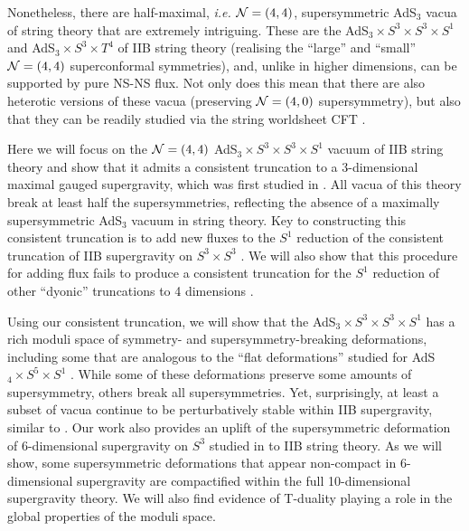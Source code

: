 \documentclass[a4paper, 11pt]{article}
\numberwithin{equation}{section}
\newcommand{\+}{\oplus}
\begin{document}
Nonetheless, there are half-maximal, \textit{i.e.} ${\cal N}=(4,4)$, supersymmetric AdS$_3$ vacua of string theory that are extremely intriguing. These are the AdS$_3 \times S^3 \times S^3 \times S^1$ and AdS$_3 \times S^3 \times T^4$ of IIB string theory (realising the ``large'' and ``small'' ${\cal N}=(4,4)$ superconformal symmetries), and, unlike in higher dimensions, can be supported by pure NS-NS flux. Not only does this mean that there are also heterotic versions of these vacua (preserving ${\cal N}=(4,0)$ supersymmetry), but also that they can be readily studied via the string worldsheet CFT \cite{Maldacena:2000hw,Eberhardt:2018ouy,Eberhardt:2019niq,Eberhardt:2019ywk}.

Here we will focus on the ${\cal N}=(4,4)$ AdS$_3 \times S^3 \times S^3 \times S^1$ vacuum of IIB string theory and show that it admits a consistent truncation to a 3-dimensional maximal gauged supergravity, which was first studied in \cite{Hohm:2005ui}. All vacua of this theory break at least half the supersymmetries, reflecting the absence of a maximally supersymmetric AdS$_3$ vacuum in string theory. Key to constructing this consistent truncation is to add new fluxes to the $S^1$ reduction of the consistent truncation of IIB supergravity on $S^3 \times S^3$ \cite{Inverso:2016eet}. We will also show that this procedure for adding flux fails to produce a consistent truncation for the $S^1$ reduction of other ``dyonic'' truncations to 4 dimensions \cite{Guarino:2015jca,Inverso:2016eet}.

Using our consistent truncation, we will show that the AdS$_3 \times S^3 \times S^3 \times S^1$ has a rich moduli space of symmetry- and supersymmetry-breaking deformations, including some that are analogous to the ``flat deformations'' studied for AdS$_4 \times S^5 \times S^1$ \cite{Guarino:2020gfe,Guarino:2021hrc,Giambrone:2021zvp,Giambrone:2021wsm}. While some of these deformations preserve some amounts of supersymmetry, others break all supersymmetries. Yet, surprisingly, at least a subset of vacua continue to be perturbatively stable within IIB supergravity, similar to \cite{Giambrone:2021wsm}. Our work also provides an uplift of the supersymmetric deformation of 6-dimensional supergravity on $S^3$ studied in \cite{Eloy:2021fhc} to IIB string theory. As we will show, some supersymmetric deformations that appear non-compact in 6-dimensional supergravity \cite{Eloy:2021fhc} are compactified within the full 10-dimensional supergravity theory. We will also find evidence of T-duality playing a role in the global properties of the moduli space.
\end{document}
